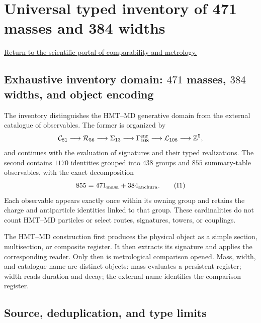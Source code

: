 \chapter{Universal typed inventory of 471 masses and 384 widths}
\label{chap:inventario-universal-471-masas-384-anchuras}
\label{app:inventario-tipado-total-rev6}

\noindent\hyperref[chap:portal-atlas-inventarios-masas]{Return to the scientific portal of comparability and metrology.}

\section{Exhaustive inventory domain: \(471\) masses, \(384\) widths, and object encoding}

The inventory distinguishes the HMT--MD generative domain from the external catalogue of
observables. The former is organized by
\[
\mathcal C_{81}\longrightarrow\mathcal R_{56}\longrightarrow\Sigma_{13}
\longrightarrow\Gamma_{108}^{\rm enr}\longrightarrow
\mathcal L_{108}\longrightarrow\mathbb Z^5,
\]
and continues with the evaluation of signatures and their typed realizations. The second
contains \(1170\) identities grouped into \(438\) groups and \(855\) summary-table
observables, with the exact decomposition
\[
855=471_{\rm masa}+384_{\rm anchura}.
\tag{I1}\label{eq:censo-total-observables-pdg-rev6}
\]
Each observable appears exactly once within its owning group and retains the
charge and antiparticle identities linked to that group. These cardinalities do not
count HMT--MD particles or select routes, signatures, towers, or couplings.

\begin{exactbox}[title={Construction, evaluation, and comparison}]
The HMT--MD construction first produces the physical object as a simple section,
multisection, or composite register. It then extracts its signature and applies the
corresponding reader. Only then is metrological comparison opened. Mass,
width, and catalogue name are distinct objects: mass evaluates a
persistent register; width reads duration and decay; the external name
identifies the comparison register.
\end{exactbox}

\section{Source, deduplication, and type limits}

